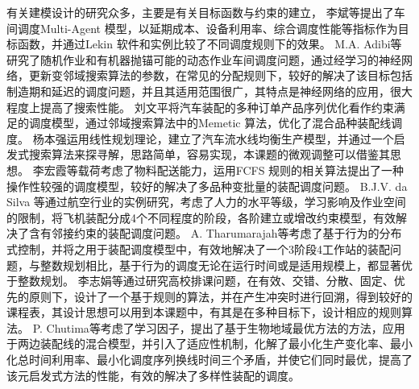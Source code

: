 有关建模设计的研究众多，主要是有关目标函数与约束的建立，
李斌\cite{李斌2009}等提出了车间调度Multi-Agent 模型，以延期成本、设备利用率、综合调度性能等指标作为目标函数，并通过Lekin 软件和实例比较了不同调度规则下的效果。
M.A. Adibi\cite{adibi2010multi}等研究了随机作业和有机器抛锚可能的动态作业车间调度问题，通过经学习的神经网络，更新变邻域搜索算法的参数，在常见的分配规则下，较好的解决了该目标包括制造期和延迟的调度问题，并且其适用范围很广，其特点是神经网络的应用，很大程度上提高了搜索性能。
刘文平\cite{刘文平2009}将汽车装配的多种订单产品序列优化看作约束满足的调度模型，通过邻域搜索算法中的Memetic 算法，优化了混合品种装配线调度。
杨本强\cite{杨本强2002}运用线性规划理论，建立了汽车流水线均衡生产模型，并通过一个启发式搜索算法来探寻解，思路简单，容易实现，本课题的微观调整可以借鉴其思想。
李宏霞\cite{李宏霞2006}等载荷考虑了物料配送能力，运用FCFS 规则的相关算法\cite{lo2002job}提出了一种操作性较强的调度模型，较好的解决了多品种变批量的装配调度问题。
B.J.V. da Silva\cite{da2014production} 等通过航空行业的实例研究，考虑了人力的水平等级，学习影响及作业空间的限制，将飞机装配分成4个不同程度的阶段，各阶建立或增改约束模型，有效解决了含有邻接约束的装配调度问题。
A. Tharumarajah\cite{1998distributed}等考虑了基于行为的分布式控制，并将之用于装配调度模型中，有效地解决了一个3阶段4工作站的装配问题，与整数规划相比，基于行为的调度无论在运行时间或是适用规模上，都显著优于整数规划。
李志娟\cite{李志娟2008}等通过研究高校排课问题，在有效、交错、分散、固定、优先的原则下，设计了一个基于规则的算法，并在产生冲突时进行回溯，得到较好的课程表，其设计思想可以用到本课题中，有其是在多种目标下，设计相应的规则算法。
P. Chutima\cite{chutima2014pareto}等考虑了学习因子，提出了基于生物地域最优方法的方法，应用于两边装配线的混合模型，并引入了适应性机制，化解了最小化生产变化率、最小化总时间利用率、最小化调度序列换线时间三个矛盾，并使它们同时最优，提高了该元启发式方法的性能，有效的解决了多样性装配的调度。

